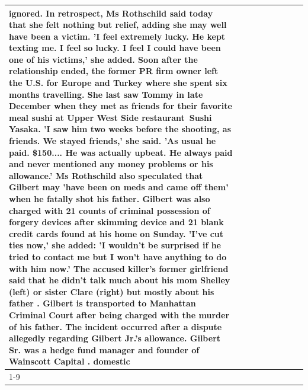 \begin{table}[H]
\begin{tabular}{lllrlllll}
ignored. In retrospect, Ms Rothschild said today that she felt nothing but relief, adding she may well have been a victim. 'I feel extremely lucky. He kept texting me. I feel so lucky. I feel I could have been one of his victims,' she added. Soon after the relationship ended, the former PR firm owner left the U.S. for Europe and Turkey where she spent six months  travelling. She last saw Tommy in late December when they met as friends for their favorite meal sushi at Upper West Side restaurant Sushi Yasaka. 'I saw him two weeks before the shooting, as friends. We stayed friends,' she said. 'As usual he paid. \$150.... He was actually upbeat. He always paid and never mentioned any money problems or his allowance.' Ms Rothschild also speculated that Gilbert may 'have been on meds and came off them' when he fatally shot his father. Gilbert was also charged with 21 counts of criminal possession of forgery devices after skimming device and 21 blank credit cards found at his home on Sunday. 'I've cut ties now,' she added: 'I wouldn’t be surprised if he tried to contact me but I won’t have anything to do with him now.' The accused killer's former girlfriend said that he didn't talk much about his mom Shelley (left) or sister Clare (right) but mostly about his father . Gilbert is transported to Manhattan Criminal Court  after being charged with the murder of his father. The incident occurred after a dispute allegedly regarding Gilbert Jr.'s allowance. Gilbert Sr. was a hedge fund manager and founder of Wainscott Capital . domestic \\
\cline{1-9}

\end{tabular}
\end{table}
